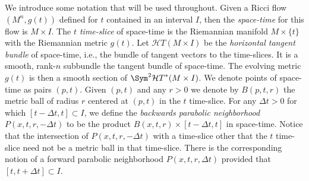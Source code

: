\begin{definition}\label{def:space-time}
\label{defnRicci}
\leanok
We introduce some notation that will be used throughout. Given a
Ricci flow $(M^n,g(t))$ defined for $t$ contained in an interval
$I$, then the {\sl space-time} for this flow is  $M\times I$.  The
{\sl $t$ time-slice} of space-time is the Riemannian manifold
$M\times\{t\}$ with the Riemannian metric $g(t)$. Let ${\mathcal
HT}(M\times I)$ be the {\em horizontal tangent
bundle} of space-time, i.e., the
bundle of tangent vectors to the time-slices. It is a smooth,
rank-$n$ subbundle the tangent bundle of space-time. The evolving
metric $g(t)$ is then a smooth section of $\Sym^2{\mathcal
HT}^*(M\times I)$. We denote points of space-time as pairs $(p,t)$.
Given $(p,t)$ and any $r>0$ we denote by $B(p,t,r)$ the metric ball
of radius $r$ centered at $(p,t)$ in the $t$ time-slice. For any
$\Delta t>0$ for which $[t-\Delta t,t]\subset I$, we define the {\sl
backwards parabolic neighborhood}
$P(x,t,r,-\Delta t)$ to be the product $B(x,t,r)\times
[t-\Delta t,t]$ in space-time. Notice that the intersection of
$P(x,t,r,-\Delta t)$ with a time-slice other that the $t$ time-slice
need not be a metric ball in that time-slice. There is the
corresponding notion of a forward parabolic neighborhood
$P(x,t,r,\Delta t)$ provided that $[t,t+\Delta t]\subset I$.
\end{definition}






